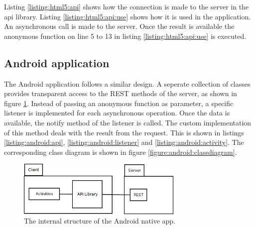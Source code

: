 Listing \ref{listing:html5:api} shows how the connection is made to the server in the api library. Listing \ref{listing:html5:api:use} shows how it is used in the application. An asynchronous call is made to the server. Once the result is available the anonymous function on line 5 to 13 in listing \ref{listing:html5:api:use} is executed.






\subsection{Android application}

The Android application follows a similar design. A seperate collection of classes provides transparent access to the REST methods of the server, as shown in figure \ref{figure:android:architecture}. Instead of passing an anonymous function as parameter, a specific listener is implemented for each asynchronous operation. Once the data is available, the notify method of the listener is called. The custom implementation of this method deals with the result from the request. This is shown in listings \ref{listing:android:api}, \ref{listing:android:listener} and \ref{listing:android:activity}. The corresponding class diagram is shown in figure \ref{figure:android:classdiagram}.

\begin{figure}
	\begin{center}
		\includegraphics[width=300px]{img/android_architecture}
		\caption{The internal structure of the Android native app.}
		\label{figure:android:architecture}
	\end{center}
\end{figure}



